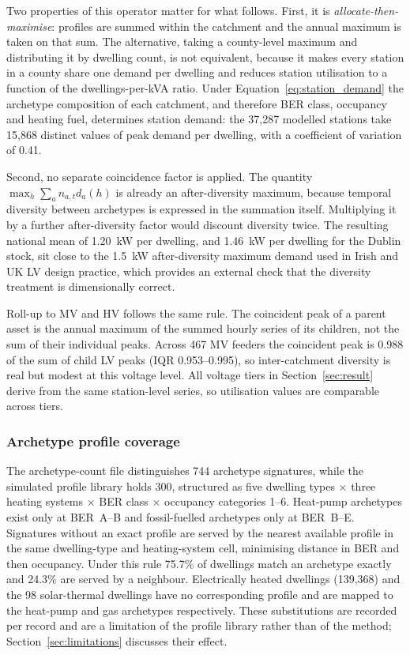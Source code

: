\documentclass[preprint,12pt]{elsarticle}
\begin{document}
Two properties of this operator matter for what follows.
First, it is \emph{allocate-then-maximise}: profiles are summed within the
catchment and the annual maximum is taken on that sum.
The alternative, taking a county-level maximum and distributing it by
dwelling count, is not equivalent, because it makes every station in a county
share one demand per dwelling and reduces station utilisation to a function
of the dwellings-per-kVA ratio.
Under Equation~\eqref{eq:station_demand} the archetype composition of each
catchment, and therefore BER class, occupancy and heating fuel, determines
station demand: the 37,287 modelled stations take 15,868 distinct values of
peak demand per dwelling, with a coefficient of variation of 0.41.

Second, no separate coincidence factor is applied.
The quantity $\max_h \sum_a n_{a,t} d_{a}(h)$ is already an after-diversity
maximum, because temporal diversity between archetypes is expressed in the
summation itself.
Multiplying it by a further after-diversity factor would discount diversity
twice.
The resulting national mean of 1.20~kW per dwelling, and 1.46~kW per dwelling
for the Dublin stock, sit close to the 1.5~kW after-diversity maximum demand
used in Irish and UK LV design practice, which provides an external check
that the diversity treatment is dimensionally correct.

Roll-up to MV and HV follows the same rule. The coincident peak of a parent
asset is the annual maximum of the summed hourly series of its children, not
the sum of their individual peaks. Across 467 MV feeders the coincident peak
is 0.988 of the sum of child LV peaks (IQR 0.953--0.995), so inter-catchment
diversity is real but modest at this voltage level. All voltage tiers in
Section~\ref{sec:result} derive from the same station-level series, so
utilisation values are comparable across tiers.

\subsubsection{Archetype profile coverage}
\label{sec:coverage}

The archetype-count file distinguishes 744 archetype signatures, while the
simulated profile library holds 300, structured as five dwelling types
$\times$ three heating systems $\times$ BER class $\times$ occupancy
categories 1--6. Heat-pump archetypes exist only at BER~A--B and
fossil-fuelled archetypes only at BER~B--E.
Signatures without an exact profile are served by the nearest available
profile in the same dwelling-type and heating-system cell, minimising
distance in BER and then occupancy.
Under this rule 75.7\% of dwellings match an archetype exactly and 24.3\% are
served by a neighbour.
Electrically heated dwellings (139,368) and the 98 solar-thermal dwellings
have no corresponding profile and are mapped to the heat-pump and gas
archetypes respectively.
These substitutions are recorded per record and are a limitation of the
profile library rather than of the method; Section~\ref{sec:limitations}
discusses their effect.
\end{document}
